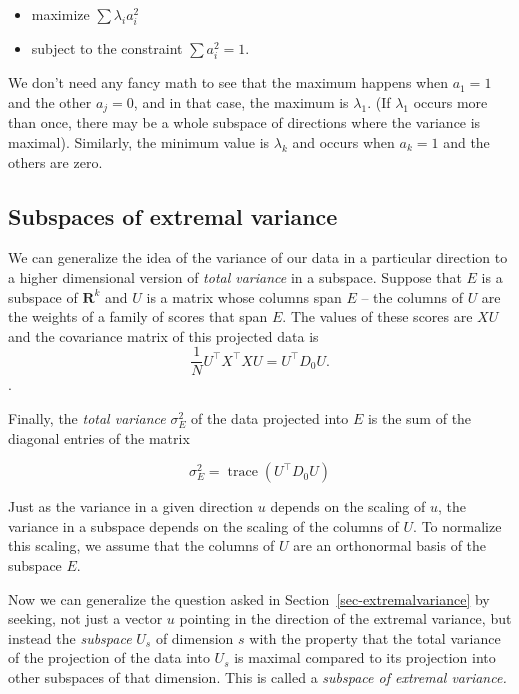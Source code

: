\documentclass[
  11pt,
  letterpaper,
]{scrbook}
\providecommand{\tightlist}{%
  \setlength{\itemsep}{0pt}\setlength{\parskip}{0pt}}\usepackage{longtable,booktabs,array}
\theoremstyle{plain}
\theoremstyle{remark}
\begin{document}
\begin{itemize}
\tightlist
\item
  maximize \(\sum \lambda_{i}a_{i}^2\)
\item
  subject to the constraint \(\sum a_{i}^2 = 1\).
\end{itemize}

We don't need any fancy math to see that the maximum happens when
\(a_{1}=1\) and the other \(a_{j}=0\), and in that case, the maximum is
\(\lambda_{1}\). (If \(\lambda_{1}\) occurs more than once, there may be
a whole subspace of directions where the variance is maximal).
Similarly, the minimum value is \(\lambda_{k}\) and occurs when
\(a_{k}=1\) and the others are zero.

\hypertarget{sec-subspaces}{%
\subsection{Subspaces of extremal variance}\label{sec-subspaces}}

We can generalize the idea of the variance of our data in a particular
direction to a higher dimensional version of \emph{total variance} in a
subspace. Suppose that \(E\) is a subspace of \(\mathbf{R}^{k}\) and
\(U\) is a matrix whose columns span \(E\) -- the columns of \(U\) are
the weights of a family of scores that span \(E\). The values of these
scores are \(XU\) and the covariance matrix of this projected data is
\[\frac{1}{N}U^{\intercal}X^{\intercal}XU=U^{\intercal}D_{0}U.\].

Finally, the \emph{total variance} \(\sigma_{E}^2\) of the data
projected into \(E\) is the sum of the diagonal entries of the matrix

\[
\sigma^2_{E} = \mathop{trace}(U^{\intercal}D_{0}U)
\]

Just as the variance in a given direction \(u\) depends on the scaling
of \(u\), the variance in a subspace depends on the scaling of the
columns of \(U\). To normalize this scaling, we assume that the columns
of \(U\) are an orthonormal basis of the subspace \(E\).

Now we can generalize the question asked in
Section~\ref{sec-extremalvariance} by seeking, not just a vector \(u\)
pointing in the direction of the extremal variance, but instead the
\emph{subspace} \(U_{s}\) of dimension \(s\) with the property that the
total variance of the projection of the data into \(U_{s}\) is maximal
compared to its projection into other subspaces of that dimension. This
is called a \emph{subspace of extremal variance.}
\end{document}
